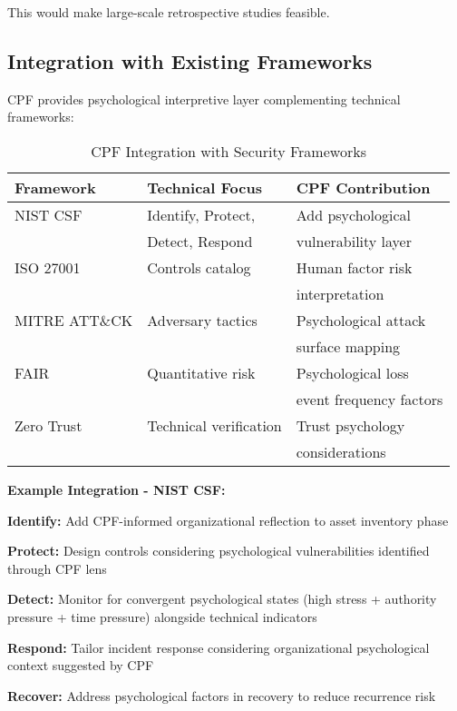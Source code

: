 \documentclass[11pt,a4paper]{article}
\begin{document}
This would make large-scale retrospective studies feasible.

\subsection{Integration with Existing Frameworks}

CPF provides psychological interpretive layer complementing technical frameworks:

\begin{table}[ht]
\centering
\caption{CPF Integration with Security Frameworks}
\label{tab:integration}
\small
\begin{tabular}{lll}
\toprule
\textbf{Framework} & \textbf{Technical Focus} & \textbf{CPF Contribution} \\
\midrule
NIST CSF & Identify, Protect, & Add psychological \\
 & Detect, Respond & vulnerability layer \\
ISO 27001 & Controls catalog & Human factor risk \\
 &  & interpretation \\
MITRE ATT\&CK & Adversary tactics & Psychological attack \\
 &  & surface mapping \\
FAIR & Quantitative risk & Psychological loss \\
 &  & event frequency factors \\
Zero Trust & Technical verification & Trust psychology \\
 &  & considerations \\
\bottomrule
\end{tabular}
\end{table}

\FloatBarrier

\textbf{Example Integration - NIST CSF:}

\textbf{Identify:} Add CPF-informed organizational reflection to asset inventory phase

\textbf{Protect:} Design controls considering psychological vulnerabilities identified through CPF lens

\textbf{Detect:} Monitor for convergent psychological states (high stress + authority pressure + time pressure) alongside technical indicators

\textbf{Respond:} Tailor incident response considering organizational psychological context suggested by CPF

\textbf{Recover:} Address psychological factors in recovery to reduce recurrence risk
\end{document}
